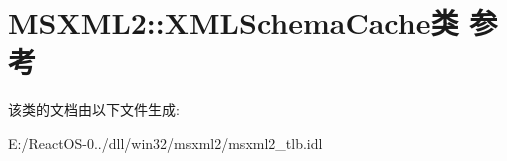 \hypertarget{class_m_s_x_m_l2_1_1_x_m_l_schema_cache}{}\section{M\+S\+X\+M\+L2\+:\+:X\+M\+L\+Schema\+Cache类 参考}
\label{class_m_s_x_m_l2_1_1_x_m_l_schema_cache}


该类的文档由以下文件生成\+:\begin{DoxyCompactItemize}
\item 
E\+:/\+React\+O\+S-\/0../dll/win32/msxml2/msxml2\+\_\+tlb.\+idl\end{DoxyCompactItemize}
